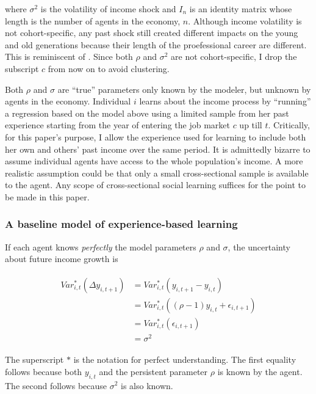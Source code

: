 \documentclass[12pt,notitlepage,onecolumn,aps,pra]{article}
\begin{document}
where \(\sigma^2\) is the volatility of income shock and \(I_n\) is an
identity matrix whose length is the number of agents in the economy,
\(n\). Although income volatility is not cohort-specific, any past shock
still created different impacts on the young and old generations because
their length of the proefessional career are different. This is
reminiscent of \cite{bansal2004risks}. Since both \(\rho\) and
\(\sigma^2\) are not cohort-specific, I drop the subscript \(c\) from
now on to avoid clustering.

Both \(\rho\) and \(\sigma\) are ``true'' parameters only known by the
modeler, but unknown by agents in the economy. Individual \(i\) learns
about the income process by ``running'' a regression based on the model
above using a limited sample from her past experience starting from the
year of entering the job market \(c\) up till \(t\). Critically, for
this paper's purpose, I allow the experience used for learning to
include both her own and others' past income over the same period. It is
admittedly bizarre to assume individual agents have access to the whole
population's income. A more realistic assumption could be that only a
small cross-sectional sample is available to the agent. Any scope of
cross-sectional social learning suffices for the point to be made in
this paper.

    \hypertarget{a-baseline-model-of-experience-based-learning}{%
\subsubsection{A baseline model of experience-based
learning}\label{a-baseline-model-of-experience-based-learning}}

If each agent knows \emph{perfectly} the model parameters \(\rho\) and
\(\sigma\), the uncertainty about future income growth is

\begin{eqnarray}
\begin{split}
Var^*_{i,t}(\Delta y_{i,t+1}) & =  Var^*_{i,t}(y_{i,t+1}- y_{i,t}) \\ 
& =  Var^*_{i,t}((\rho-1)y_{i,t} + \epsilon_{i,t+1}) \\
& = Var^*_{i,t}(\epsilon_{i,t+1}) \\
& = \sigma^2
\end{split}
\end{eqnarray}

The superscript \(*\) is the notation for perfect understanding. The
first equality follows because both \(y_{i,t}\) and the persistent
parameter \(\rho\) is known by the agent. The second follows because
\(\sigma^2\) is also known.
\end{document}
